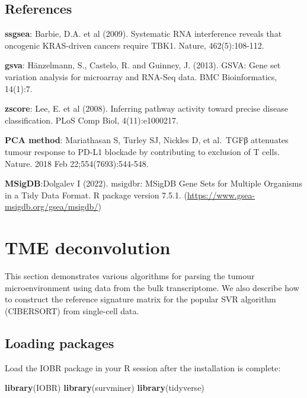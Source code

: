 \documentclass[
  12pt,
]{book}
\newenvironment{Shaded}{\begin{snugshade}}{\end{snugshade}}
\newcommand{\FunctionTok}[1]{\textcolor[rgb]{0.13,0.29,0.53}{\textbf{#1}}}
\newcommand{\NormalTok}[1]{#1}
\begin{document}
\hypertarget{references-1}{%
\section{References}\label{references-1}}

\textbf{ssgsea}: Barbie, D.A. et al (2009). Systematic RNA interference reveals that oncogenic KRAS-driven cancers require TBK1. Nature, 462(5):108-112.

\textbf{gsva}: Hänzelmann, S., Castelo, R. and Guinney, J. (2013). GSVA: Gene set variation analysis for microarray and RNA-Seq data. BMC Bioinformatics, 14(1):7.

\textbf{zscore}: Lee, E. et al (2008). Inferring pathway activity toward precise disease classification. PLoS Comp Biol, 4(11):e1000217.

\textbf{PCA method}: Mariathasan S, Turley SJ, Nickles D, et al.~TGFβ attenuates tumour response to PD-L1 blockade by contributing to exclusion of T cells. Nature. 2018 Feb 22;554(7693):544-548.

\textbf{MSigDB}:Dolgalev I (2022). msigdbr: MSigDB Gene Sets for Multiple Organisms in a Tidy Data Format. R package version 7.5.1. (\url{https://www.gsea-msigdb.org/gsea/msigdb/})

\hypertarget{tme-deconvolution}{%
\chapter{\texorpdfstring{\textbf{TME deconvolution}}{TME deconvolution}}\label{tme-deconvolution}}

This section demonstrates various algorithms for parsing the tumour microenvironment using data from the bulk transcriptome. We also describe how to construct the reference signature matrix for the popular SVR algorithm (CIBERSORT) from single-cell data.

\hypertarget{loading-packages-2}{%
\section{Loading packages}\label{loading-packages-2}}

Load the IOBR package in your R session after the installation is complete:

\begin{Shaded}
\begin{Highlighting}[]
\FunctionTok{library}\NormalTok{(IOBR)}
\FunctionTok{library}\NormalTok{(survminer)}
\FunctionTok{library}\NormalTok{(tidyverse)}
\end{Highlighting}
\end{Shaded}
\end{document}
